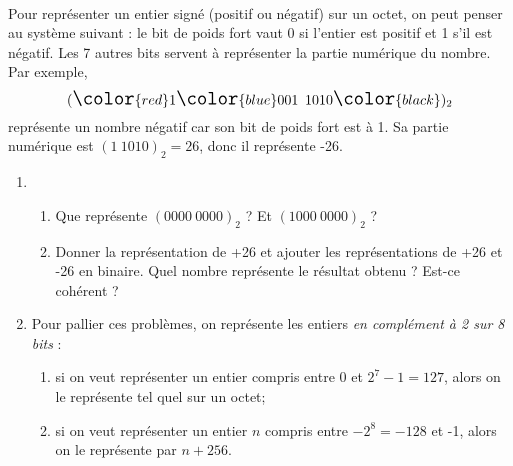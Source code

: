 \documentclass[a4paper,10pt]{book}
\begin{document}
\\

Pour représenter un entier signé (positif ou négatif) sur un octet, on peut penser au système suivant : le bit de poids fort vaut 0 si l'entier est positif et 1 s'il est négatif. Les 7 autres bits servent à représenter la partie numérique du nombre.\\
Par exemple, $$\Large(\color{red}1\color{blue}001\ 1010\color{black})_2$$
représente un nombre négatif car son bit de poids fort est à 1. Sa partie numérique est $(1\ 1010)_2=26$, donc il représente -26.
\begin{enumerate}[\bfseries 1.]
	\item 	\begin{enumerate}[\bfseries a.]
		\item 	Que représente $(0000\ 0000)_2$ ? Et $(1000\ 0000)_2$ ?
		\item 	Donner la représentation de +26 et ajouter les représentations de +26 et -26 en binaire. Quel nombre représente le résultat obtenu ? Est-ce cohérent ?
	\end{enumerate}
	\item 	Pour pallier ces problèmes, on représente les entiers \textit{en complément à 2 sur 8 bits} :
			\begin{enumerate}[--]
				\item 	si on veut représenter un entier compris entre 0 et $2^7-1=127$, alors on le représente tel quel sur un octet;
				\item 	si on veut représenter un entier $n$ compris entre $-2^8=-128$ et -1, alors on le représente par $n+256$.
			\end{enumerate}


\end{enumerate}
\end{document}
